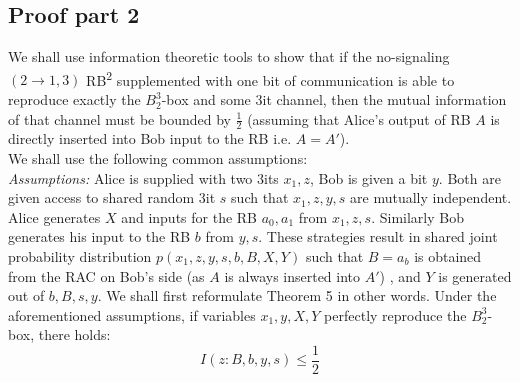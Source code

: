 \subsection*{Proof part 2}
We shall use information theoretic tools to show that if the no-signaling $(2\rightarrow 1,3)$ RB\textsuperscript{2} supplemented with one bit of communication is able to reproduce exactly the $B^3_2$-box and some $3$it channel, then the mutual information of that channel must be bounded by $\frac{1}{2}$ (assuming that Alice's output of RB $A$ is directly inserted into Bob input to the RB i.e. $A=A'$). \\
We shall use the following common assumptions:\\
\textit{Assumptions:} Alice is supplied with two $3$its $x_1,z$, Bob is given a bit $y$. Both are given access to shared random $3$it $s$ such that $x_1,z,y,s$ are mutually independent. Alice generates $X$ and inputs for the RB $a_0,a_1$ from $x_1,z,s$. Similarly Bob generates his input to the RB $b$ from $y,s$. These strategies result in shared joint probability distribution $p(x_1,z,y,s,b,B,X,Y)$ such that $B=a_b$ is obtained from the RAC on Bob's side (as $A$ is always inserted into $A'$) , and $Y$ is generated out of $b,B,s,y$. 
We shall first reformulate Theorem 5 in other words.
Under the aforementioned assumptions, if variables $x_1,y,X,Y$ perfectly reproduce the $B^3_2$-box, there holds:
\begin{equation}\label{main}
I(z:B,b,y,s)\leq \frac{1}{2}
\end{equation}

